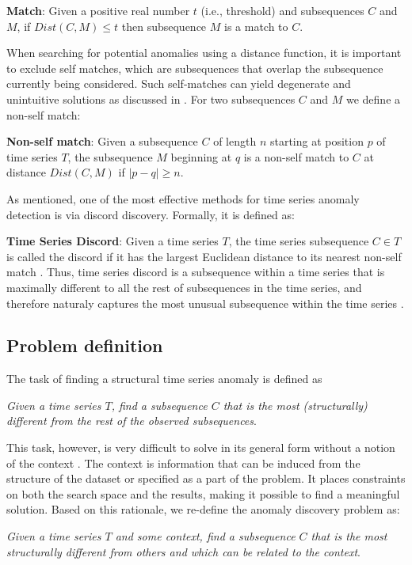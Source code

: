 \documentclass{sig-alternate}
\begin{document}
\textbf{Match}: Given a positive real number $t$ (i.e., threshold) and subsequences $C$ and $M$, if $Dist(C,M)\leq t$ then subsequence $M$ is a match to $C$.

When searching for potential anomalies using a distance function, it is important to exclude self matches, which are subsequences that overlap the subsequence currently being considered. Such self-matches can yield degenerate and unintuitive solutions as discussed in \cite{hot_sax}. For two subsequences $C$ and $M$ we define a non-self match:

\textbf{Non-self match}: Given a subsequence $C$ of  length $n$ starting at position $p$ of time series $T$, the subsequence $M$ beginning at $q$ is a non-self match to $C$ at distance $Dist(C,M)$ if $|p-q| \geq n$.

As mentioned, one of the most effective methods for time series anomaly detection is via discord discovery. Formally, it is defined as:

\textbf{Time Series Discord}: Given a time series $T$, the time series subsequence $C \in T$ is called the discord if it has the largest Euclidean distance to its nearest non-self match \cite{hot_sax}. Thus, time series discord is a subsequence within a time series that is maximally different to all the rest of subsequences in the time series, and therefore naturaly captures the most unusual subsequence within the time series \cite{hot_sax}.

\subsection{Problem definition}
The task of finding a structural time series anomaly is defined as 

\textit{Given a time series $T$, find a subsequence $C$ that is the most (structurally) different from the rest of the observed subsequences}.

This task, however, is very difficult to solve in its general form without a notion of the context   \cite{chan_anomaly}.  The context is information that can be induced from the structure of the dataset or specified as a part of the problem. It places constraints on both the search space and the results, making it possible to find a meaningful solution. Based on this rationale, we re-define the anomaly discovery problem as: 

\textit{Given a time series $T$ and some context, find a subsequence $C$ that is the most structurally different from others and which can be related to the context}.
\end{document}

